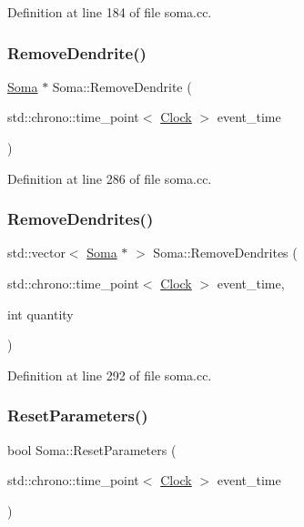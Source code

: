 Definition at line 184 of file soma.\+cc.

\mbox{\label{class_soma_a85c7d4b41486182c9528f5c43beaf7fd}} 
\subsubsection{\texorpdfstring{Remove\+Dendrite()}{RemoveDendrite()}}
{\footnotesize\ttfamily \mbox{\hyperlink{class_soma}{Soma}} $\ast$ Soma\+::\+Remove\+Dendrite (\begin{DoxyParamCaption}\item[{std\+::chrono\+::time\+\_\+point$<$ \mbox{\hyperlink{universe_8h_a0ef8d951d1ca5ab3cfaf7ab4c7a6fd80}{Clock}} $>$}]{event\+\_\+time }\end{DoxyParamCaption})}



Definition at line 286 of file soma.\+cc.

\mbox{\label{class_soma_ad15baed4b2f5dab6f93e5df8fd1f7b23}} 
\subsubsection{\texorpdfstring{Remove\+Dendrites()}{RemoveDendrites()}}
{\footnotesize\ttfamily std\+::vector$<$ \mbox{\hyperlink{class_soma}{Soma}} $\ast$ $>$ Soma\+::\+Remove\+Dendrites (\begin{DoxyParamCaption}\item[{std\+::chrono\+::time\+\_\+point$<$ \mbox{\hyperlink{universe_8h_a0ef8d951d1ca5ab3cfaf7ab4c7a6fd80}{Clock}} $>$}]{event\+\_\+time,  }\item[{int}]{quantity }\end{DoxyParamCaption})}



Definition at line 292 of file soma.\+cc.

\mbox{\label{class_soma_a82f016dc126f7d1053e5eb455d28c44b}} 
\subsubsection{\texorpdfstring{Reset\+Parameters()}{ResetParameters()}}
{\footnotesize\ttfamily bool Soma\+::\+Reset\+Parameters (\begin{DoxyParamCaption}\item[{std\+::chrono\+::time\+\_\+point$<$ \mbox{\hyperlink{universe_8h_a0ef8d951d1ca5ab3cfaf7ab4c7a6fd80}{Clock}} $>$}]{event\+\_\+time }\end{DoxyParamCaption})}



